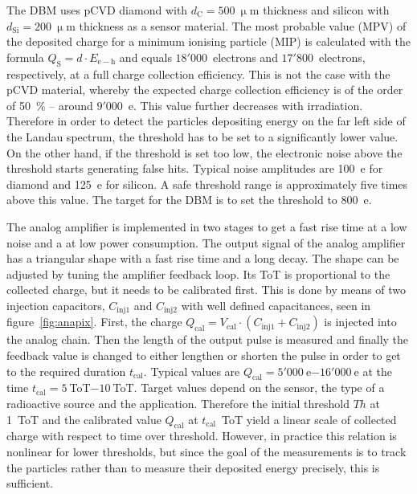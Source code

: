 The DBM uses pCVD diamond with $d_\mathrm{C}=500~\upmu$m thickness and silicon with $d_\mathrm{Si}=200~\upmu$m thickness as a sensor material. The most probable value (MPV) of the deposited charge for a minimum ionising particle (MIP) is calculated with the formula $Q_\mathrm{S}=d \cdot E_\mathrm{e-h}$ and equals $18'000$~electrons and $17'800$~electrons, respectively, at a full charge collection efficiency. This is not the case with the pCVD material, whereby the expected charge collection efficiency is of the order of 50~\%  -- around $9'000$~e. This value further decreases with irradiation. Therefore in order to detect the particles depositing energy on the far left side of the Landau spectrum, the threshold has to be set to a significantly lower value. On the other hand, if the threshold is set too low, the electronic noise above the threshold starts generating false hits. Typical noise amplitudes are 100~e for diamond and 125~e for silicon. A safe threshold range is approximately five times above this value. The target for the DBM is to set the threshold to 800~e.

The analog amplifier is implemented in two stages to get a fast rise time at a low noise and a at low power consumption. The output signal of the analog amplifier has a triangular shape with a fast rise time and a long decay.  The shape can be adjusted by tuning the amplifier feedback loop. Its ToT is proportional to the collected charge, but it needs to be calibrated first. This is done by means of two injection capacitors, $C_\mathrm{inj1}$ and $C_\mathrm{inj2}$ with well defined capacitances, seen in figure~\ref{fig:anapix}. First, the charge $Q_\mathrm{cal}=V_\mathrm{cal}\cdot(C_\mathrm{inj1}+C_\mathrm{inj2})$ is injected into the analog chain. Then the length of the output pulse is measured and finally the feedback value is changed to either lengthen or shorten the pulse in order to get to the required duration $t_\mathrm{cal}$. Typical values are $Q_\mathrm{cal}=5'000~$e$-16'000~$e at the time $t_\mathrm{cal}=5~$ToT$-10~$ToT. Target values depend on the sensor, the type of a radioactive source and the application. Therefore the initial threshold $Th$ at 1~ToT and the calibrated value $Q_\mathrm{cal}$ at $t_\mathrm{cal}$~ToT yield a linear scale of collected charge with respect to time over threshold.
However, in practice this relation is nonlinear for lower thresholds, but since the goal of the measurements is to track the particles rather than to measure their deposited energy precisely, this is sufficient. 


